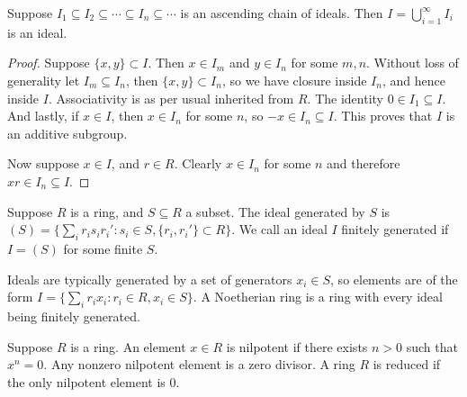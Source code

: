 \begin{proposition}\label{prop:nested-ideals}
    Suppose \(I_1 \subseteq I_2 \subseteq \cdots \subseteq
    I_n \subseteq \cdots\) is an ascending chain of ideals.
    Then \(I = \bigcup_{i=1}^\infty I_i\) is an ideal.
\end{proposition}
\begin{proof}
    Suppose \(\{x,y\} \subset I\).
    Then \(x \in I_m\) and \(y \in I_n\) for some \(m,n\).
    Without loss of generality let \(I_m \subseteq I_n\),
    then \(\{x,y\} \subset I_n\),
    so we have closure inside \(I_n\), and hence inside \(I\).
    Associativity is as per usual inherited from \(R\).
    The identity \(0 \in I_1 \subseteq I\).
    And lastly, if \(x \in I\), then \(x \in I_n\) for some \(n\),
    so \(-x \in I_n \subseteq I\).
    This proves that \(I\) is an additive subgroup.
    
    Now suppose \(x \in I\), and \(r \in R\).
    Clearly \(x \in I_n\) for some \(n\)
    and therefore \(xr \in I_n \subseteq I\).
\end{proof}

\begin{definition}
    Suppose \(R\) is a ring, and \(S \subseteq R\) a subset.
    The ideal generated by \(S\) is
    \((S) = \{\sum_i r_i s_i r_i' : s_i \in S, \{r_i,r_i'\} \subset R\}\).
    We call an ideal \(I\) finitely generated
    if \(I = (S)\) for some finite \(S\).
\end{definition}
\begin{remark}
    Ideals are typically generated by a set of generators \(x_i \in S\),
    so elements are of the form
    \(I = \{\sum_i r_i x_i : r_i \in R, x_i \in S\}\).
    A Noetherian ring is a ring with every ideal being finitely generated.
\end{remark}

\begin{definition}
    Suppose \(R\) is a ring.
    An element \(x \in R\) is nilpotent if there exists \(n > 0\) such that \(x^n = 0\).
    Any nonzero nilpotent element is a zero divisor.
    A ring \(R\) is reduced if the only nilpotent element is 0.
\end{definition}

